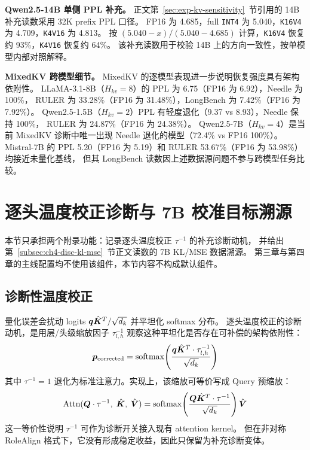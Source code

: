 \textbf{Qwen2.5-14B 单侧 PPL 补充。}
正文第~\ref{sec:exp-kv-sensitivity}~节引用的 14B 补充读数采用 32K prefix PPL 口径。
FP16 为 4.685，full \texttt{INT4} 为 5.040，\texttt{K16V4} 为 4.709，\texttt{K4V16} 为 4.813。
按 $(5.040 - x)/(5.040 - 4.685)$ 计算，\texttt{K16V4} 恢复约 93\%，\texttt{K4V16} 恢复约 64\%。
该补充读数用于校验 14B 上的方向一致性，按单模型内部对照解释。

\textbf{MixedKV 跨模型细节。}
\label{subsec:app-mixedkv-detail}
MixedKV 的逐模型表现进一步说明恢复强度具有架构依附性。
LLaMA-3.1-8B（$H_{kv}=8$）的 PPL 为 6.75（FP16 为 6.92），Needle 为 100\%，
RULER 为 33.28\%（FP16 为 31.48\%），LongBench 为 7.42\%（FP16 为 7.92\%）。
Qwen2.5-1.5B（$H_{kv}=2$）PPL 有轻度退化（9.37 vs 8.93），Needle 保持 100\%，
RULER 为 24.87\%（FP16 为 24.38\%）。
Qwen2.5-7B（$H_{kv}=4$）是当前 MixedKV 诊断中唯一出现 Needle 退化的模型（72.4\% vs FP16 100\%）。
Mistral-7B 的 PPL 5.20（FP16 为 5.19）和 RULER 53.67\%（FP16 为 53.98\%）均接近未量化基线，
但其 LongBench 读数因上述数据源问题不参与跨模型任务比较。

\section{逐头温度校正诊断与 7B 校准目标溯源}
\label{sec:app-invtau-diagnostic}%
\label{sec:app-invtau-detail}

本节只承担两个附录功能：记录逐头温度校正 \(\tau^{-1}\) 的补充诊断动机，
并给出第~\ref{subsec:ch4-disc-kl-mse}~节正文读数的 7B KL/MSE 数据溯源。
第三章与第四章的主线配置均不使用该组件，本节内容不构成默认组件。
\subsection{诊断性温度校正}
量化误差会扰动 logits $\bm{q}\hat{\bm{K}}^T / \sqrt{d_k}$ 并平坦化 softmax 分布。
逐头温度校正的诊断动机，是用层/头级缩放因子 \(\tau^{-1}_{l,h}\) 观察这种平坦化是否存在可补偿的架构依附性：
\begin{equation}
  \bm{p}_{\text{corrected}} = \operatorname{softmax}\!\left(\frac{\bm{q}\hat{\bm{K}}^T \cdot \tau^{-1}_{l,h}}{\sqrt{d_k}}\right)
  \label{eq:app-corrected-attn}
\end{equation}
其中 \(\tau^{-1}=1\) 退化为标准注意力。实现上，该缩放可等价写成 Query 预缩放：
\begin{equation}
  \text{Attn}(\bm{Q} \cdot \tau^{-1},\; \hat{\bm{K}},\; \hat{\bm{V}})
  = \operatorname{softmax}\!\left(\frac{\bm{Q} \hat{\bm{K}}^T \cdot \tau^{-1}}{\sqrt{d_k}}\right) \hat{\bm{V}}
  \label{eq:app-q-prescale}
\end{equation}
这一等价性说明 \(\tau^{-1}\) 可作为诊断开关接入现有 attention kernel。
但在非对称 RoleAlign 格式下，它没有形成稳定收益，因此只保留为补充诊断变体。

